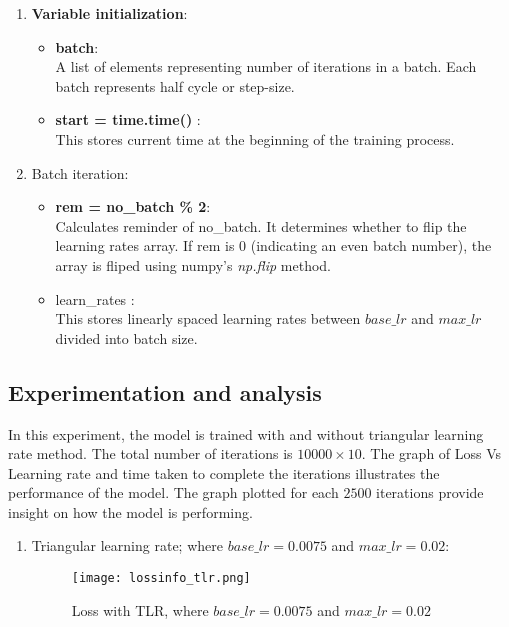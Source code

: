 \begin{enumerate}
    \item \textbf{Variable initialization}: 
    \begin{itemize}
        \item \textbf{batch}: \\ A list of elements representing number of iterations in a batch. Each batch represents half cycle or step-size.
        \item \textbf{start = time.time()} :\\ This stores current time at the beginning of the training process.
    \end{itemize}
    \item Batch iteration: \\
     \begin{itemize}
        \item \textbf{rem = no\_batch \% 2}: \\ Calculates reminder of no\_batch. It determines whether to flip the learning rates array. If rem is 0 (indicating an even batch number), the array is fliped using numpy's \parencite{harris2020array} \textit{np.flip} method.
        \item learn\_rates :\\ This stores linearly spaced learning rates between $base\_lr$ and $max\_lr$ divided into batch size.
    \end{itemize}
    
    
\end{enumerate}


\subsection{Experimentation and analysis}
In this experiment, the model is trained with and without triangular learning rate method. The total number of iterations is $10000 \times 10$. The graph of Loss Vs Learning rate and time taken to complete the iterations illustrates the performance of the model. The graph plotted for each $2500$ iterations provide insight on how the model is performing. 
\begin{enumerate}
    \item Triangular learning rate; where $base\_lr =0.0075$ and $max\_lr=0.02$: \\
    
    \begin{figure}[H]
        \centering    
        \texttt{[image: lossinfo\_tlr.png]}
        \caption{Loss with TLR, where $base\_lr =0.0075$ and $max\_lr=0.02$
        }
        \label{fig:trl_loss}
    \end{figure}

   
    
\end{enumerate}

